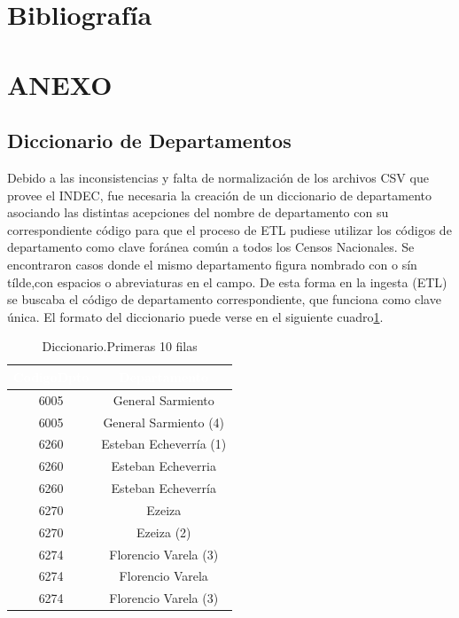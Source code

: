 \documentclass{article}
\theoremstyle{mytheoremstyle}
\theoremstyle{mytheoremstyle}
\theoremstyle{myproblemstyle}
\begin{document}
\section{Bibliografía}
\printbibliography%

\section{ANEXO}
 \subsection{Diccionario de Departamentos } 
Debido a las inconsistencias y falta de normalización de los archivos CSV que provee el INDEC,
 fue necesaria la creación de un diccionario de departamento asociando las distintas acepciones del nombre de
  departamento con su correspondiente código para que el proceso de ETL pudiese utilizar los códigos de departamento 
  como clave foránea común a todos los Censos Nacionales.
  Se encontraron casos donde el mismo departamento figura nombrado con o sín tílde,con espacios o abreviaturas en el campo. \newline
De esta forma en la ingesta (ETL) se buscaba el código de departamento correspondiente, que funciona como clave única.
 El formato del diccionario puede verse en el siguiente cuadro\ref{tab:diccionario}.
\begin{table}[htb]
  \centering
  \begin{tabular}{|c|c|}
  \hline
  \textbf{\cellcolor[rgb]{0,0.231,0.427}\textcolor{white}{CodigoDpto}} & \textbf{\cellcolor[rgb]{0,0.231,0.427}\textcolor{white}{Departamento}} \\ \hline
  6005 & General Sarmiento \\
  6005 & General Sarmiento (4) \\
  6260 & Esteban Echeverría (1) \\
  6260 & Esteban Echeverria \\
  6260 & Esteban Echeverría \\
  6270 & Ezeiza \\
  6270 & Ezeiza (2) \\
  6274 & Florencio Varela (3)  \\
  6274 & Florencio Varela \\
  6274 & Florencio Varela (3)  \\
  \hline
  \end{tabular}
  \caption{Diccionario.Primeras 10 filas}
  \label{tab:diccionario}
  \end{table}
\end{document}
